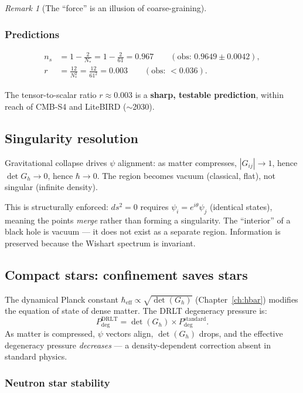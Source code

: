 \documentclass[12pt]{article}
\theoremstyle{remark}
\newtheorem{remark}[theorem]{Remark}
\theoremstyle{definition}
\begin{document}
\begin{remark}[The ``force'' is an illusion of coarse-graining]
\subsubsection{Predictions}
\begin{align}
n_s &= 1 - \frac{2}{N_*} = 1 - \frac{2}{61} = 0.967 \qquad (\text{obs: } 0.9649 \pm 0.0042), \\
r &= \frac{12}{N_*^2} = \frac{12}{61^2} = 0.003 \qquad (\text{obs: } < 0.036).
\end{align}

The tensor-to-scalar ratio $r \approx 0.003$ is a \textbf{sharp, testable prediction}, within reach of CMB-S4 and LiteBIRD ($\sim$2030).

\subsection{Singularity resolution}

Gravitational collapse drives $\psi$ alignment: as matter compresses, $|G_{ij}| \to 1$, hence $\det G_h \to 0$, hence $\hbar \to 0$. The region becomes vacuum (classical, flat), not singular (infinite density).

This is structurally enforced: $ds^2 = 0$ requires $\psi_i = e^{i\theta}\psi_j$ (identical states), meaning the points \emph{merge} rather than forming a singularity. The ``interior'' of a black hole is vacuum --- it does not exist as a separate region. Information is preserved because the Wishart spectrum is invariant.

\subsection{Compact stars: confinement saves stars}

The dynamical Planck constant $\hbar_\text{eff} \propto \sqrt{\det(G_h)}$ (Chapter~\ref{ch:hbar}) modifies the equation of state of dense matter. The DRLT degeneracy pressure is:
\begin{equation}
P_\text{deg}^\text{DRLT} = \det(G_h) \times P_\text{deg}^\text{standard}.
\end{equation}
As matter is compressed, $\psi$ vectors align, $\det(G_h)$ drops, and the effective degeneracy pressure \emph{decreases} --- a density-dependent correction absent in standard physics.

\subsubsection{Neutron star stability}


\end{remark}
\end{document}
